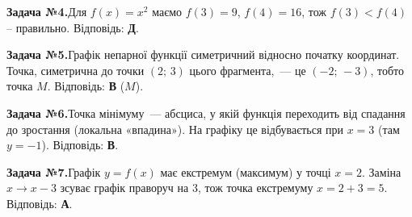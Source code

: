 \documentclass[12pt]{article}
\begin{document}
\par\vspace{0.3cm}\noindent\hypertarget{sol:4}{}
\begin{tcolorbox}[colback=titleBg!40, colframe=mainGreen!55, boxrule=0.4pt, arc=2pt, left=6pt, right=6pt, top=4pt, bottom=4pt, breakable]
\noindent\small\textbf{Задача №4.}\quad Для $f(x)=x^2$ маємо $f(3)=9$, $f(4)=16$, тож $f(3)<f(4)$ -- правильно. Відповідь: \textbf{Д}.
\par\vspace{0.1cm}\hfill\hyperlink{task:4}{}
\end{tcolorbox}
\par\vspace{0.3cm}\noindent\hypertarget{sol:5}{}
\begin{tcolorbox}[colback=titleBg!40, colframe=mainGreen!55, boxrule=0.4pt, arc=2pt, left=6pt, right=6pt, top=4pt, bottom=4pt, breakable]
\noindent\small\textbf{Задача №5.}\quad Графік непарної функції симетричний відносно початку координат. Точка, симетрична до точки $(2;\,3)$ цього фрагмента,~--- це $(-2;\,-3)$, тобто точка $M$. Відповідь: \textbf{В} ($M$).
\par\vspace{0.1cm}\hfill\hyperlink{task:5}{}
\end{tcolorbox}
\par\vspace{0.3cm}\noindent\hypertarget{sol:6}{}
\begin{tcolorbox}[colback=titleBg!40, colframe=mainGreen!55, boxrule=0.4pt, arc=2pt, left=6pt, right=6pt, top=4pt, bottom=4pt, breakable]
\noindent\small\textbf{Задача №6.}\quad Точка мінімуму~--- абсциса, у якій функція переходить від спадання до зростання (локальна «впадина»). На графіку це відбувається при $x=3$ (там $y=-1$). Відповідь: \textbf{В}.
\par\vspace{0.1cm}\hfill\hyperlink{task:6}{}
\end{tcolorbox}
\par\vspace{0.3cm}\noindent\hypertarget{sol:7}{}
\begin{tcolorbox}[colback=titleBg!40, colframe=mainGreen!55, boxrule=0.4pt, arc=2pt, left=6pt, right=6pt, top=4pt, bottom=4pt, breakable]
\noindent\small\textbf{Задача №7.}\quad Графік $y=f(x)$ має екстремум (максимум) у точці $x=2$. Заміна $x\to x-3$ зсуває графік праворуч на $3$, тож точка екстремуму $x=2+3=5$. Відповідь: \textbf{А}.
\par\vspace{0.1cm}\hfill\hyperlink{task:7}{}
\end{tcolorbox}
\end{document}
